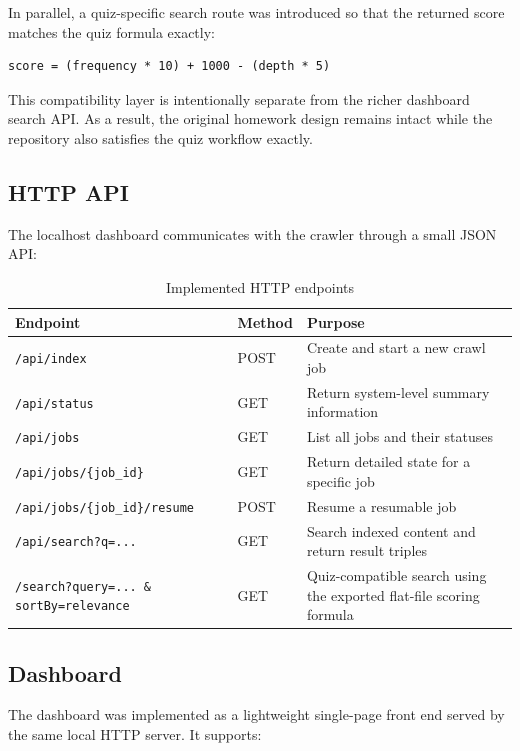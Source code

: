 \documentclass[pdftex,12pt,a4paper]{article}
\begin{document}
In parallel, a quiz-specific search route was introduced so that the returned score matches the quiz formula exactly:

\begin{Verbatim}[fontsize=\small]
score = (frequency * 10) + 1000 - (depth * 5)
\end{Verbatim}

This compatibility layer is intentionally separate from the richer dashboard search API. As a result, the original homework design remains intact while the repository also satisfies the quiz workflow exactly.

\subsection{HTTP API}

The localhost dashboard communicates with the crawler through a small JSON API:

\begin{table}[H]
\centering
\caption{Implemented HTTP endpoints}
\begin{tabular}{|p{3.2cm}|p{2cm}|p{7.8cm}|}
\hline
\textbf{Endpoint} & \textbf{Method} & \textbf{Purpose} \\
\hline
\texttt{/api/index} & POST & Create and start a new crawl job \\
\hline
\texttt{/api/status} & GET & Return system-level summary information \\
\hline
\texttt{/api/jobs} & GET & List all jobs and their statuses \\
\hline
\texttt{/api/jobs/\{job\_id\}} & GET & Return detailed state for a specific job \\
\hline
\texttt{/api/jobs/\{job\_id\}/resume} & POST & Resume a resumable job \\
\hline
\texttt{/api/search?q=...} & GET & Search indexed content and return result triples \\
\hline
\texttt{/search?query=... \& sortBy=relevance} & GET & Quiz-compatible search using the exported flat-file scoring formula \\
\hline
\end{tabular}
\label{tab:api}
\end{table}

\subsection{Dashboard}

The dashboard was implemented as a lightweight single-page front end served by the same local HTTP server. It supports:
\end{document}
